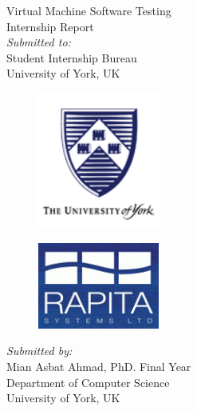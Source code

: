 \documentclass[11pt,a4paper]{report}
\begin{document}
  \begin{titlepage}
    \centering
    {\fontsize{22}{32}\selectfont Virtual Machine Software Testing}\\[1.5\baselineskip]
     {\fontsize{17}{27}\selectfont Internship Report}\\[2.5\baselineskip]
    
    
    
    {\fontsize{12}{22}\selectfont \it {Submitted to:} }\\[0.5\baselineskip]    
     {\fontsize{13}{23}\selectfont Student Internship Bureau }\\[.5\baselineskip]    
     {\fontsize{13}{23}\selectfont  University of York, UK }\\[0.5\baselineskip]    



\begin{figure}[h]
\centering
\parbox{5cm}{
\includegraphics[width=4cm]{uniLogo.png}
\label{fig:2figsA}}
\qquad
\begin{minipage}{5cm}
\includegraphics[width=4cm]{rapitaLogo.png}
\label{fig:2figsB}
\end{minipage}
\end{figure}

\bigskip
\bigskip

 {\fontsize{12}{22}\selectfont \it {Submitted by:} }\\[0.5\baselineskip]    
     {\fontsize{13}{23}\selectfont Mian Asbat Ahmad, PhD. Final Year }\\[0.5\baselineskip]
      {\fontsize{13}{23}\selectfont Department of Computer Science}\\[0.5\baselineskip]    
     {\fontsize{13}{23}\selectfont  University of York, UK }\\[2\baselineskip]    



\end{titlepage}
\end{document}
